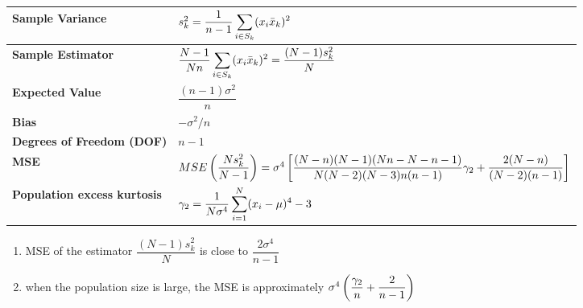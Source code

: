 \begin{longtable}{|p{2cm}|p{12cm}|}
    \hline

    \textbf{Sample Variance} & \vspace{0.01cm} $
        s_k^2 = \dfrac{1}{n-1}
        \displaystyle\sum_{i\in S_k} (x_i \bar{x}_k)^2
    $ \vspace{0.1cm} \\
    \hline

    \textbf{Sample Estimator} & \vspace{0.01cm} $
        \dfrac{N-1}{Nn} \displaystyle\sum_{i\in S_k}
        (x_i \bar{x}_k)^2
        = \dfrac{(N-1)s_k^2}{N}
    $ \vspace{0.1cm}\\
    \hline

    \textbf{Expected Value} & \vspace{0.01cm} $
        \dfrac{(n-1)\sigma^2}{n}
    $ \vspace{0.1cm} \\
    \hline

    \textbf{Bias} & \vspace{0.01cm} $
        -\sigma^2/n
    $ \vspace{0.1cm} \\
    \hline

    \textbf{Degrees of Freedom (DOF)} & $n-1$\\
    \hline

    \textbf{MSE} & \vspace{0.1cm} $
        MSE\left( \dfrac{Ns_k^2}{N-1} \right)
        = \sigma^4 \left[ 
            \dfrac{
                (N-n)(N-1)(Nn-N-n-1)
            }{
                N(N-2)(N-3)n(n-1)
            }\gamma_2
            + \dfrac{2(N-n)}{(N-2)(n-1)}
        \right]
    $ \vspace{0.1cm} \\
    \hline

    \textbf{Population excess kurtosis} & $
        \gamma_2 = \dfrac{1}{N\sigma^4}
        \displaystyle\sum_{i=1}^{N} (x_i-\mu)^4 - 3
    $\\
    \hline
\end{longtable}

\begin{enumerate}
    \item MSE of the estimator $\dfrac{(N-1)s_k^2}{N}$ is close to $\dfrac{2\sigma^4}{n-1}$

    \item when the population size is large, the MSE is approximately $\sigma^4\left( \dfrac{\gamma_2}{n} + \dfrac{2}{n-1} \right)$
\end{enumerate}


